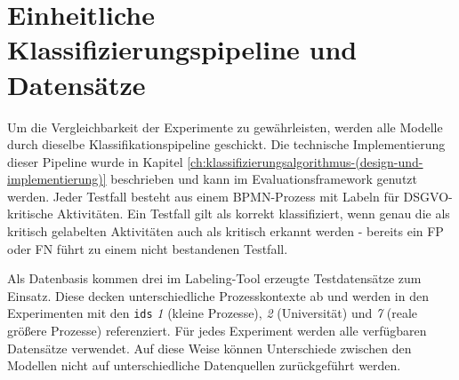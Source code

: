 \section{Einheitliche Klassifizierungspipeline und Datensätze}\label{sec:einheitliche-klassifizierungspipeline-und-datensatze}

Um die Vergleichbarkeit der Experimente zu gewährleisten, werden alle Modelle durch dieselbe Klassifikationspipeline geschickt. Die technische Implementierung dieser Pipeline wurde in Kapitel \ref{ch:klassifizierungsalgorithmus-(design-und-implementierung)} beschrieben und kann im Evaluationsframework genutzt werden. Jeder Testfall besteht aus einem \ac{BPMN}-Prozess mit Labeln für \ac{DSGVO}-kritische Aktivitäten. Ein Testfall gilt als korrekt klassifiziert, wenn genau die als kritisch gelabelten Aktivitäten auch als kritisch erkannt werden - bereits ein \ac{FP} oder \ac{FN} führt zu einem nicht bestandenen Testfall.

Als Datenbasis kommen drei im Labeling-Tool erzeugte Testdatensätze zum Einsatz. Diese decken unterschiedliche Prozesskontexte ab und werden in den Experimenten mit den \texttt{ids} \emph{1} (kleine Prozesse), \emph{2} (Universität) und \emph{7} (reale größere Prozesse) referenziert. Für jedes Experiment werden alle verfügbaren Datensätze verwendet. Auf diese Weise können Unterschiede zwischen den Modellen nicht auf unterschiedliche Datenquellen zurückgeführt werden.